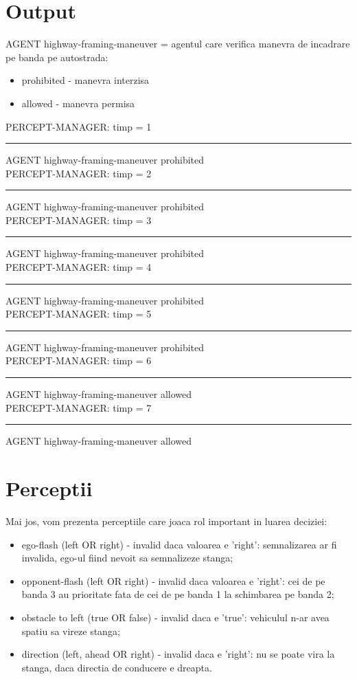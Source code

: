\documentclass[a4paper,12pt]{report}
\begin{document}
\section{Output}
AGENT highway-framing-maneuver = agentul care verifica manevra de incadrare pe banda pe autostrada: \\
\begin{itemize}
    \item prohibited - manevra interzisa
    \item allowed - manevra permisa
\end{itemize}
PERCEPT-MANAGER: timp = 1\\
\rule{1cm} *AGENT highway-framing-maneuver prohibited\\
PERCEPT-MANAGER: timp = 2\\
\rule{1cm} *AGENT highway-framing-maneuver prohibited\\
PERCEPT-MANAGER: timp = 3\\
\rule{1cm} *AGENT highway-framing-maneuver prohibited\\
PERCEPT-MANAGER: timp = 4\\
\rule{1cm} *AGENT highway-framing-maneuver prohibited\\
PERCEPT-MANAGER: timp = 5\\
\rule{1cm} *AGENT highway-framing-maneuver prohibited\\
PERCEPT-MANAGER: timp = 6\\
\rule{1cm} *AGENT highway-framing-maneuver allowed\\
PERCEPT-MANAGER: timp = 7\\
\rule{1cm} *AGENT highway-framing-maneuver allowed\\

\section{Perceptii}
Mai jos, vom prezenta perceptiile care joaca rol important in luarea deciziei: \\
\begin{itemize}
    \item ego-flash (left OR right) - invalid daca valoarea e 'right': semnalizarea ar fi invalida, ego-ul fiind nevoit sa semnalizeze stanga;
    \item opponent-flash (left OR right) - invalid daca valoarea e 'right': cei de pe banda 3 au prioritate fata de cei de pe banda 1 la schimbarea pe banda 2;
    \item obstacle to left (true OR false) - invalid daca e 'true': vehiculul n-ar avea spatiu sa vireze stanga;
    \item direction (left, ahead OR right) - invalid daca e 'right': nu se poate vira la stanga, daca directia de conducere e dreapta.
\end{itemize}
\end{document}
